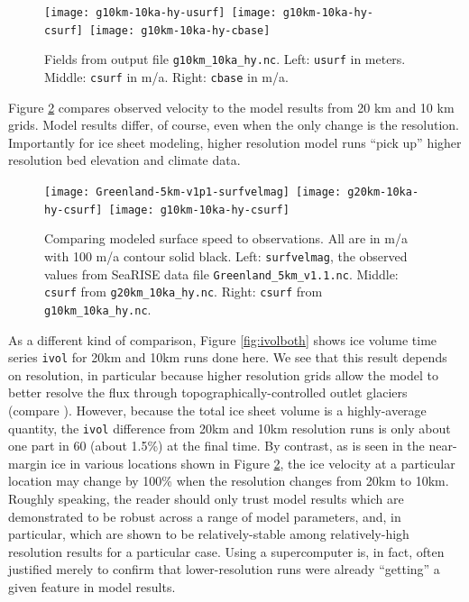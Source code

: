 \begin{figure}[ht]
\centering
\mbox{\texttt{[image: g10km-10ka-hy-usurf]} \texttt{[image: g10km-10ka-hy-csurf]} \texttt{[image: g10km-10ka-hy-cbase]}}
\caption{Fields from output file \texttt{g10km_10ka_hy.nc}.  Left: \texttt{usurf} in meters.  Middle: \texttt{csurf} in m/a.  Right: \texttt{cbase} in m/a.}
\label{fig:secondoutputfiner}
\end{figure}

Figure \ref{fig:csurfvsobserved} compares observed velocity to the model results from 20 km and 10 km grids.  Model results differ, of course, even when the only change is the resolution.  Importantly for ice sheet modeling, higher resolution model runs ``pick up'' higher resolution bed elevation and climate data.

\begin{figure}[ht]
\centering
\mbox{\texttt{[image: Greenland-5km-v1p1-surfvelmag]} \texttt{[image: g20km-10ka-hy-csurf]} \texttt{[image: g10km-10ka-hy-csurf]}}
\caption{Comparing modeled surface speed to observations.  All are in m/a with 100 m/a contour solid black.  Left: \texttt{surfvelmag}, the observed values from SeaRISE data file \texttt{Greenland_5km_v1.1.nc}.  Middle: \texttt{csurf} from \texttt{g20km_10ka_hy.nc}.  Right: \texttt{csurf} from \texttt{g10km_10ka_hy.nc}.}
\label{fig:csurfvsobserved}
\end{figure}

As a different kind of comparison, Figure \ref{fig:ivolboth} shows ice volume time series \texttt{ivol} for 20km and 10km runs done here.  We see that this result depends on resolution, in particular because higher resolution grids allow the model to better resolve the flux through topographically-controlled outlet glaciers (compare \cite{Pfefferetal2008}).  However, because the total ice sheet volume is a highly-average quantity, the \texttt{ivol} difference from 20km and 10km resolution runs is only about one part in 60 (about 1.5\%) at the final time.  By contrast, as is seen in the near-margin ice in various locations shown in Figure \ref{fig:csurfvsobserved}, the ice velocity at a particular location may change by 100\% when the resolution changes from 20km to 10km.  Roughly speaking, the reader should only trust model results which are demonstrated to be robust across a range of model parameters, and, in particular, which are shown to be relatively-stable among relatively-high resolution results for a particular case.  Using a supercomputer is, in fact, often justified merely to confirm that lower-resolution runs were already ``getting'' a given feature in model results.

